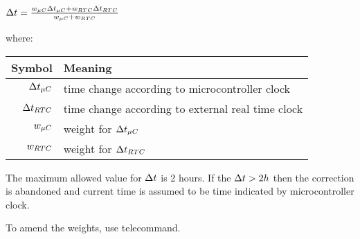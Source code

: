 $\Delta t = \frac{w_{\mu C} \Delta t_{\mu C} + w_{RTC} \Delta t_{RTC}}{w_{\mu C} + w_{RTC}}$

where:

\begin{tabular}{r | l}
	Symbol & Meaning \\
	\hline
	$\Delta t_{\mu C}$ & time change according to microcontroller clock \\ 
	$\Delta t_{RTC}$ & time change according to external real time clock \\
	\label{sec:time-wMcu} $w_{\mu C}$ & weight for $\Delta t_{\mu C}$ \\
	\label{sec:time-wRtc} $w_{RTC}$ & weight for $\Delta t_{RTC}$ \\
\end{tabular}

The maximum allowed value for $\Delta t$ is 2 hours. If the $\Delta t > 2 h$ then the correction is abandoned and current time is assumed to be time indicated by microcontroller clock.

To amend the weights, use  telecommand.